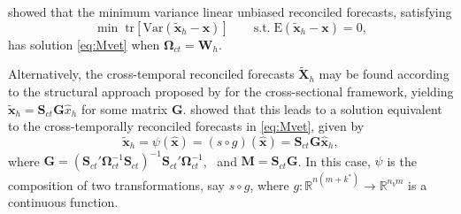 \documentclass[a4paper,11pt]{article}
\newcommand{\xvet}{\bm{x}}
\newcommand{\Gvet}{\bm{G}}
\newcommand{\Mvet}{\bm{M}}
\newcommand{\Svet}{\bm{S}}
\newcommand{\Xvet}{\bm{X}}
\newcommand{\Omegavet}{\bm{\Omega}}
\theoremstyle{definition}
\begin{document}
\citet{wickramasuriya2019} showed that the minimum variance linear unbiased reconciled forecasts, satisfying
$$
  \min \; \text{tr}[\text{Var}(\widetilde{\bm{x}}_h -\bm{x})]\qquad \text{s.t.} \; \text{E}(\widetilde{\bm{x}}_h -\bm{x}) = 0,
$$
has solution \eqref{eq:Mvet} when $\Omegavet_{ct} = \bm{W}_h$.

Alternatively, the cross-temporal reconciled forecasts $\widetilde{\Xvet}_{h}$ may be found according to the structural approach proposed by \cite{hyndman2011} for the cross-sectional framework, yielding $\widetilde{\bm{x}}_h = \Svet_{ct}\Gvet \widehat{x}_h$ for some matrix $\Gvet$. \citet{wickramasuriya2019} showed that this leads to a solution equivalent to the cross-temporally reconciled forecasts in \eqref{eq:Mvet}, given by
\begin{equation}\label{eq:SGy}
	\widetilde{\xvet}_{h} = \psi\left(\widehat{\xvet}\right) = \left(s \circ g \right)\left(\widehat{\xvet}\right)=\Svet_{ct}\Gvet \widehat{\xvet}_{h},
\end{equation}
where $\Gvet = (\Svet_{ct}' \Omegavet_{ct}^{-1}\Svet_{ct})^{-1} \Svet_{ct}'\Omegavet_{ct}^{-1}$,~ and $\Mvet = \Svet_{ct} \Gvet$. In this case, $\psi$ is the composition of two transformations, say $s \circ g$, where $g: \mathbb{R}^{n(m+k^\ast)} \rightarrow \mathbb{R}^{n_b m}$ is a continuous function.
\end{document}

